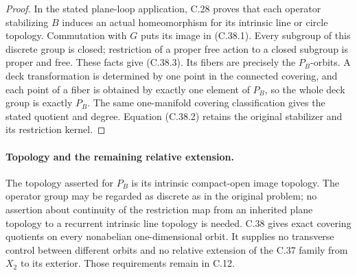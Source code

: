 \begin{proof}
In the stated plane-loop application, C.28 proves
that each operator stabilizing $B$ induces an actual
homeomorphism for its intrinsic line or circle
topology. Commutation with $G$ puts its image in
(C.38.1). Every subgroup of this discrete group is
closed; restriction of a proper free action to a
closed subgroup is proper and free. These facts
give (C.38.3). Its fibers are precisely the
$P_B$-orbits. A deck transformation is determined
by one point in the connected covering, and each
point of a fiber is obtained by exactly one
element of $P_B$, so the whole deck group is
exactly $P_B$. The same one-manifold covering
classification gives the stated quotient and
degree. Equation (C.38.2) retains the original
stabilizer and its restriction kernel.
\end{proof}

\paragraph{Topology and the remaining relative extension.}
The topology asserted for $P_B$ is its intrinsic
compact-open image topology. The operator group may
be regarded as discrete as in the original problem;
no assertion about continuity of the restriction
map from an inherited plane topology to a recurrent
intrinsic line topology is needed.
C.38 gives exact covering quotients on every
nonabelian one-dimensional orbit. It supplies no
transverse control between different orbits and no
relative extension of the C.37 family from $X_2$
to its exterior. Those requirements remain in C.12.
